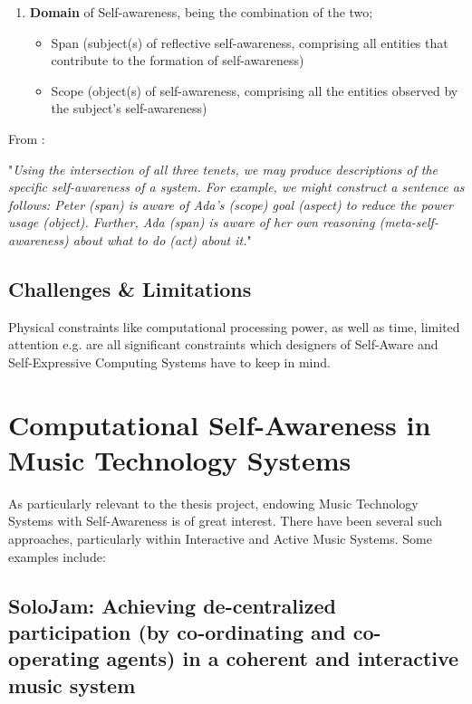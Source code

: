 \documentclass{article}
\begin{document}
\begin{enumerate}
    \item \textbf{Domain} of Self-awareness, being the combination of the two;
        \begin{itemize}
            \item Span (subject(s) of reflective self-awareness, comprising all entities that contribute to the formation of self-awareness)
            \item Scope (object(s) of self-awareness, comprising all the entities observed by the subject's self-awareness)
        \end{itemize}
\end{enumerate}

From \cite{sacs17_ch3}:

"\textit{Using the intersection of all three tenets, we may produce descriptions of the
specific self-awareness of a system. For example, we might construct a sentence as
follows: Peter (span) is aware of Ada’s (scope) goal (aspect) to reduce the power usage
(object). Further, Ada (span) is aware of her own reasoning (meta-self-awareness) about what to do (act) about it.}"

\subsection{Challenges \& Limitations}

Physical constraints like computational processing power, as well as time, limited attention e.g. are all significant constraints which designers of Self-Aware and Self-Expressive Computing Systems have to keep in mind.
\newpage










\section{Computational Self-Awareness in Music Technology Systems}

As particularly relevant to the thesis project, endowing Music Technology Systems with Self-Awareness is of great interest. There have been several such approaches, particularly within Interactive and Active Music Systems. Some examples include:

\subsection{SoloJam: Achieving de-centralized participation (by co-ordinating and co-operating agents) in a coherent and interactive music system}
\end{document}
